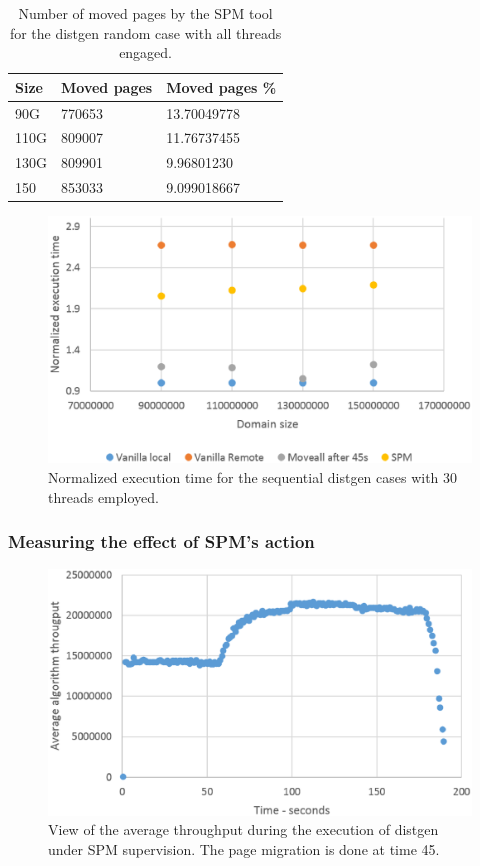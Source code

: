 \begin{table}[th]
	\centering
		\begin{tabularx}{\textwidth}{|l|l|X|}
		\hline
			Size & Moved pages & Moved pages \%  \\
			\hline
			90G & 770653 & 13.70049778 \\
			\hline
			110G & 809007 & 11.76737455 \\
			\hline
			130G & 809901 & 9.96801230 \\
			\hline
			150 & 853033 & 9.099018667 \\
			\hline
		\end{tabularx}
		\caption{Number of moved pages by the SPM tool for the distgen random case with all threads engaged.}
		\label{table:res-tbl-dgenmvdseqat}
\end{table}

\begin{figure}[th]
	\centering
		\includegraphics[width=.8\textwidth]{figures/time-dgenatt-ser.eps}
		\caption{Normalized execution time for the sequential distgen cases with 30 threads employed.}
		\label{fig:time-dgenatt-ser}
\end{figure}

\subsubsection{Measuring the effect of SPM's action}\label{subsection:time-dgenat-action.eps}

\begin{figure}[th]
	\centering
		\includegraphics[width=.8\textwidth]{figures/at-thrput-random.eps}
		\caption{View of the average throughput during the execution of distgen under SPM supervision. The page migration is done at time 45.}
		\label{fig:at-spmactn-thgput}
\end{figure}

